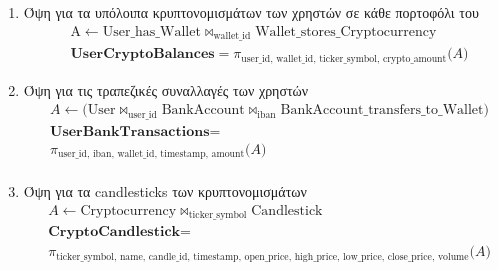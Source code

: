 \begin{enumerate}

\item Όψη για τα υπόλοιπα κρυπτονομισμάτων των χρηστών σε κάθε πορτοφόλι του
\[
\begin{aligned}
&\text{A} \leftarrow \text{User\_has\_Wallet}
\bowtie_{\text{wallet\_id}} \text{Wallet\_stores\_Cryptocurrency}
\\
&\textbf{UserCryptoBalances} =
\pi_{\text{user\_id, wallet\_id, ticker\_symbol, crypto\_amount}} \bigl(A\bigr)
\end{aligned}
\]

\item Όψη για τις τραπεζικές συναλλαγές των χρηστών
\[
\begin{aligned}
&A \leftarrow 
\bigl(
  \text{User} \bowtie_{\text{user\_id}}
  \text{BankAccount} \bowtie_{\text{iban}}
  \text{BankAccount\_transfers\_to\_Wallet}
\bigr) \\
&\textbf{UserBankTransactions} = \\
&\pi_{\text{user\_id, iban, wallet\_id, 
timestamp, amount}}\bigl(A\bigr) \\
\end{aligned}
\]

\item Όψη για τα candlesticks των κρυπτονομισμάτων
\[
\begin{aligned}
& A \leftarrow \text{Cryptocurrency} \bowtie_{\text{ticker\_symbol}} \text{Candlestick} \\
& \textbf{CryptoCandlestick} = \\
& \pi_{\text{ticker\_symbol, name, candle\_id, timestamp, open\_price,
high\_price, low\_price, close\_price, volume}}
\bigl(A\bigr)
\end{aligned}
\]

\end{enumerate}